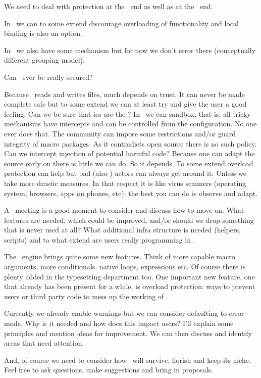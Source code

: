 \blank[2*big]

We need to deal with protection at the \TEX\ end as well as at the \LUA\
end.

In \LUA\ we can to some extend discourage overloading of functionality and
local binding is also an option.

In \METAPOST\ we also have some mechanism but for now we don't error there
(conceptually different grouping model).


\stoptitle

\starttitle[title=Virus protection]

Can \TEX\ ever be really secured?

\startitemize
\startitem
    Because \TEX\ reads and writes files, much depends on trust.
\stopitem
\startitem
    It can never be made complete safe but to some extend we can at least try and
    give the user a good feeling.
\stopitem
\startitem
    Can we be sure that  \TEX ies are the ?
\stopitem
\startitem
    In \CONTEXT\ we can sandbox, that is, all tricky mechanisms have intercepts and
    can be controlled from the configuration. No one ever does that.
\stopitem
\startitem
    The community can impose some restrictions and/or guard integrity of
    macro packages. As it contradicts open source there is no such policy.
\stopitem
\startitem
    Can we intercept injection of potential harmful code? Because one can
    adapt the source early on there is little we can do. So it depends.
\stopitem
\startitem
    To some extend overload protection can help but bad (also \TEX) actors
    can always get around it. Unless we take more drastic measures.
\stopitem
\startitem
    In that respect it is like virus scanners (operating system, browsers,
    apps on phones, etc): the best you can do is observe and adapt.
\stopitem
\stopitemize

\stoptitle

\stopdocument

A \CONTEXT\ meeting is a good moment to consider and discuss how to move on. What
features are needed, which could be improved, and/or should we drop something
that is never used at all? What additional infra structure is needed (helpers,
scripts) and to what extend are users really programming in \TEX.

The \LUAMETATEX\ engine brings quite some new features. Think of more capable
macro arguments, more conditionals, native loops, expressions etc. Of course
there is plenty added in the typesetting department too. One important new
feature, one that already has been present for a while, is overload protection:
ways to prevent users or third party code to mess up the working of \CONTEXT.

Currently we already enable warnings but we can consider defaulting to error
mode. Why is it needed and how does this impact users? I'll explain some
principles and mention ideas for improvement. We can then discuss and identify
areas that need attention.

And, of course we need to consider how \TEX\ will survive, florish and keep its
niche. Feel free to ask questions, make suggestions and bring in proposals.
